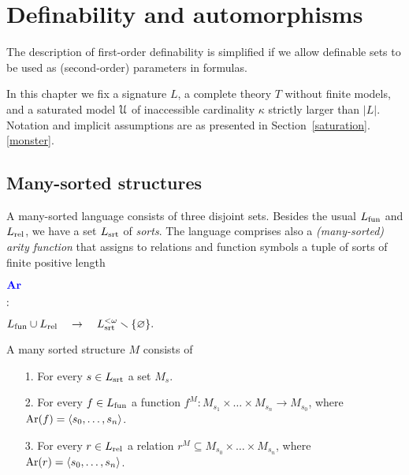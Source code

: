 \documentclass[creche.tex]{subfiles}
\begin{document}
\chapter{Definability and automorphisms}
\label{imaginary}

\def\ceq#1#2#3{\parbox{15ex}{$\displaystyle #1$}\parbox{6ex}{\hfil$\displaystyle #2$}$\displaystyle  #3$}

\def\medrel#1{\parbox[t]{6ex}{$\displaystyle\hfil #1$}}
\def\ceq#1#2#3{\parbox[t]{25ex}{$\displaystyle #1$}\medrel{#2}{$\displaystyle #3$}}


\def\b{b\llap{\raisebox{-.8ex}{-\hskip.2ex}}}
\def\a{a\llap{\raisebox{-.8ex}{-\hskip.2ex}}}
\def\d{{\rm def}}

The description of first-order definability is simplified if we allow definable sets to be used as (second-order) parameters in formulas.

In this chapter we fix a signature $L$, a complete theory $T$ without finite models, and a saturated model $\EuScript U$ of inaccessible cardinality $\kappa$ strictly larger than $|L|$. Notation and implicit assumptions are as presented in Section~\ref{saturation}.\ref{monster}.

\section{Many-sorted structures}
\label{many-sorted}
\def\Ar{{\rm Ar}}

A many-sorted language consists of three disjoint sets. Besides the usual $L_{\rm fun}$ and $L_{\rm rel}$, we have a set $L_{\rm srt}$ of \emph{sorts}. The language comprises also a \emph{(many-sorted) arity function} that assigns to relations and function symbols a tuple of sorts of finite positive length

\ceq{\hfill\emph{Ar}}{:}{L_{\rm fun}\cup L_{\rm rel}\quad \to\quad L_{\rm srt}^{<\omega}\sm\{\0\}.}

A many sorted structure $M$ consists of
\begin{itemize}
\item[1.] For every $s\in L_{\rm srt}$ a set $M_s$.
\item[2.] For every $f\in L_{\rm fun}$ a function $f^M:M_{s_1}\times\dots\times M_{s_n}\to M_{s_0}$, where $\Ar(f)=\<s_0,\dots,s_n\>$.
\item[3.] For every $r\in L_{\rm rel}$ a relation $r^M\subseteq M_{s_0}\times\dots\times M_{s_n}$, where $\Ar(r)=\<s_0,\dots,s_n\>$.
\end{itemize}
\end{document}
